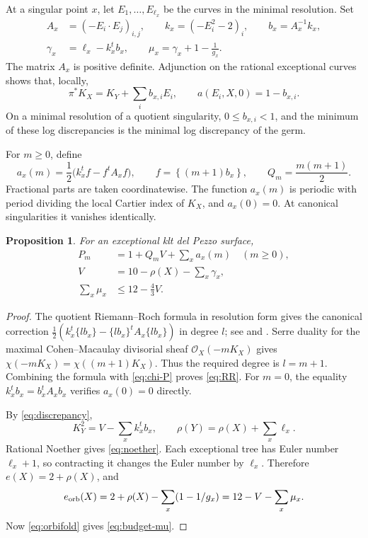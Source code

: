 \documentclass[12pt,a4paper]{article}
\numberwithin{equation}{section}
\newtheorem{proposition}[theorem]{Proposition}
\theoremstyle{definition}
\newcommand{\OO}{\mathcal O}
\newcommand{\fracpart}[1]{\left\{#1\right\}}
\begin{document}
At a singular point \(x\), let \(E_1,\ldots,E_{\ell_x}\) be the curves
in the minimal resolution. Set
\begin{equation}\label{eq:local-invariants}
 \begin{split}
 A_x&=(-E_i\cdot E_j)_{i,j},\qquad
 k_x=(-E_i^2-2)_i,\qquad b_x=A_x^{-1}k_x,\\
 \gamma_x&=\ell_x-k_x^tb_x,\qquad
 \mu_x=\gamma_x+1-\frac1{g_x}.
 \end{split}
\end{equation}
The matrix \(A_x\) is positive definite. Adjunction on the rational
exceptional curves shows that, locally,
\begin{equation}\label{eq:discrepancy}
       \pi^*K_X=K_Y+\sum_i b_{x,i}E_i,\qquad
       a(E_i,X,0)=1-b_{x,i}.
\end{equation}
On a minimal resolution of a quotient singularity,
\(0\leq b_{x,i}<1\), and the minimum of these log discrepancies is
the minimal log discrepancy of the germ.

For \(m\geq0\), define
\begin{equation}\label{eq:local-correction}
 a_x(m)=\frac12\bigl(k_x^tf-f^tA_xf\bigr),
                  \qquad f=\fracpart{(m+1)b_x},
 \qquad Q_m=\frac{m(m+1)}2.
\end{equation}
Fractional parts are taken coordinatewise.
The function \(a_x(m)\) is periodic with period dividing the local
Cartier index of \(K_X\), and \(a_x(0)=0\).
At canonical singularities it vanishes identically.

\begin{proposition}\label{prop:global-identities}
For an exceptional klt del Pezzo surface,
\begin{align}
 P_m&=1+Q_mV+\sum_xa_x(m) \quad(m\geq0),\label{eq:RR}\\
 V&=10-\rho(X)-\sum_x\gamma_x,\label{eq:noether}\\
 \sum_x\mu_x&\leq12-\frac43V.\label{eq:budget-mu}
\end{align}
\end{proposition}

\begin{proof}
The quotient Riemann--Roch formula in resolution form gives the
canonical correction
\(\frac12(k_x^t\{lb_x\}-\{lb_x\}^tA_x\{lb_x\})\) in degree \(l\);
see \cite[Proposition 5.2]{Bla95} and
\cite[Definition 9.2 and Lemma 9.4]{LL26stable}.
Serre duality for the maximal Cohen--Macaulay divisorial sheaf
\(\OO_X(-mK_X)\) gives
\(\chi(-mK_X)=\chi((m+1)K_X)\).
Thus the required degree is \(l=m+1\).
Combining the formula with \eqref{eq:chi-P} proves \eqref{eq:RR}.
For \(m=0\), the equality \(k_x^tb_x=b_x^tA_xb_x\) verifies
\(a_x(0)=0\) directly.

By \eqref{eq:discrepancy},
\[
 K_Y^2=V-\sum_x k_x^tb_x,\qquad
 \rho(Y)=\rho(X)+\sum_x\ell_x.
\]
Rational Noether gives \eqref{eq:noether}.
Each exceptional tree has Euler number \(\ell_x+1\), so contracting it
changes the Euler number by \(\ell_x\). Therefore
\(e(X)=2+\rho(X)\), and
\[
 e_{\rm orb}(X)
 =2+\rho(X)-\sum_x(1-1/g_x)
 =12-V-\sum_x\mu_x.
\]
Now \eqref{eq:orbifold} gives \eqref{eq:budget-mu}.
\end{proof}
\end{document}
